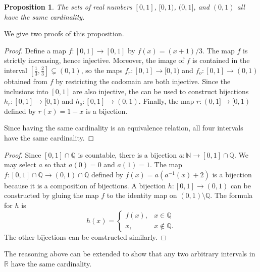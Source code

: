 \documentclass[12pt]{article}
\newtheorem*{proposition*}{Proposition}
\begin{document}
\begin{proposition*}
The sets of real numbers $[0,1]$, $[0,1)$, $(0,1]$, and $(0,1)$ all have the same cardinality.
\end{proposition*}

We give two proofs of this proposition.

\begin{proof}
Define a map $f:[0,1]\to[0,1]$ by $f(x)=(x+1)/3$.  The map $f$ is strictly increasing, hence injective.  Moreover, the image of $f$ is contained in the interval $[\frac{1}{3}, \frac{2}{3}]\subsetneq (0,1)$, so the maps 
$f_r:[0,1]\to[0,1)$ and $f_o:[0,1]\to(0,1)$ obtained from $f$ by restricting the codomain are both injective.  Since the inclusions into $[0,1]$ are also injective, the  can be used to construct bijections $h_r:[0,1]\to[0,1)$ and $h_o:[0,1]\to(0,1)$.  Finally, the map $r:(0,1]\to[0,1)$ defined by $r(x)=1-x$ is a bijection.

Since having the same cardinality is an equivalence relation, all four intervals have the same cardinality.
\end{proof}

\begin{proof}
Since $[0,1]\cap\mathbb{Q}$ is countable, there is a bijection $a:\mathbb{N}\to[0,1]\cap\mathbb{Q}$.  We may select $a$ so that $a(0)=0$ and $a(1)=1$.  The map $f:[0,1]\cap\mathbb{Q}\to(0,1)\cap\mathbb{Q}$ defined by $f(x)=a(a^{-1}(x)+2)$ is a bijection because it is a composition of bijections.  A bijection $h:[0,1]\to(0,1)$ can be constructed by gluing the map $f$ to the identity map on $(0,1)\setminus\mathbb{Q}$.  The formula for $h$ is
\[
h(x)=\begin{cases}
f(x),    & x\in\mathbb{Q} \\
x,       & x\notin\mathbb{Q}.
\end{cases}
\]
The other bijections can be constructed similarly.
\end{proof}

The reasoning above can be extended to show that any two arbitrary intervals in $\mathbb{R}$ have the same cardinality.
\end{document}
